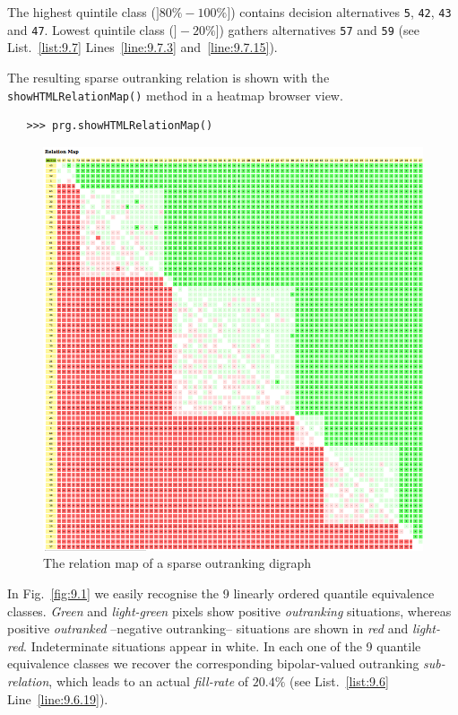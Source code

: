 The highest quintile class ($]80\%-100\%]$) contains decision alternatives \texttt{5}, \texttt{42}, \texttt{43} and \texttt{47}. Lowest quintile class ($]-20\%]$) gathers alternatives \texttt{57} and \texttt{59} (see List.~\vref{list:9.7} Lines~\ref{line:9.7.3} and~\ref{line:9.7.15}).

The resulting sparse outranking relation is shown with the \texttt{showHTMLRela\-tionMap()} method in a heatmap browser view.
\begin{lstlisting}
   >>> prg.showHTMLRelationMap()
\end{lstlisting}
\begin{figure}[ht]
\includegraphics[width=\hsize]{Figures/9-1-sparse75RelationMap.png}
\caption{The relation map of a sparse outranking digraph}
\label{fig:9.1}       %
\end{figure}

In Fig.~\vref{fig:9.1} we easily recognise the 9 linearly ordered quantile equivalence classes. \emph{Green} and \emph{light-green} pixels show positive \emph{outranking} situations, whereas positive \emph{outranked} --negative outranking-- situations are shown in \emph{red} and \emph{light-red}. Indeterminate situations appear in white. In each one of the 9 quantile equivalence classes we recover the corresponding bipolar-valued outranking \emph{sub-relation}, which leads to an actual \emph{fill-rate} of $20.4\%$ (see List.~\vref{list:9.6} Line~\ref{line:9.6.19}).

